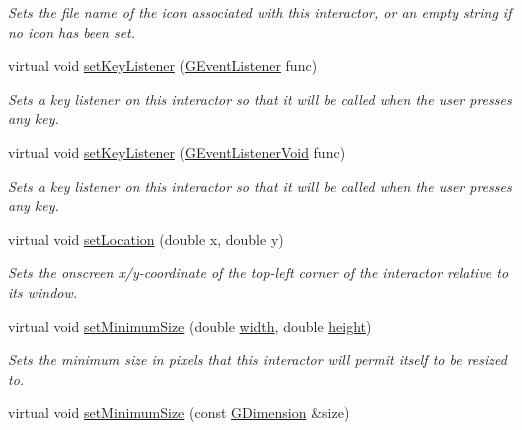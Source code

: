 \begin{DoxyCompactItemize}
\begin{DoxyCompactList}\small\item\em Sets the file name of the icon associated with this interactor, or an empty string if no icon has been set. \end{DoxyCompactList}\item 
virtual void \mbox{\hyperlink{classsgl_1_1GInteractor_aeb8324d3287fa1fbe093f4d6230cf0a6}{set\+Key\+Listener}} (\mbox{\hyperlink{namespacesgl_ae9f3e9eab70035da1a2b114e21357b25}{G\+Event\+Listener}} func)
\begin{DoxyCompactList}\small\item\em Sets a key listener on this interactor so that it will be called when the user presses any key. \end{DoxyCompactList}\item 
virtual void \mbox{\hyperlink{classsgl_1_1GInteractor_ae48ecea73606c7bd9423e1c7cc589cc9}{set\+Key\+Listener}} (\mbox{\hyperlink{namespacesgl_a54427ce97bb1c2804e4fe2b0a62e8b17}{G\+Event\+Listener\+Void}} func)
\begin{DoxyCompactList}\small\item\em Sets a key listener on this interactor so that it will be called when the user presses any key. \end{DoxyCompactList}\item 
virtual void \mbox{\hyperlink{classsgl_1_1GInteractor_a04594e8ba9b98513a64f1da00dcae18c}{set\+Location}} (double x, double y)
\begin{DoxyCompactList}\small\item\em Sets the onscreen x/y-\/coordinate of the top-\/left corner of the interactor relative to its window. \end{DoxyCompactList}\item 
virtual void \mbox{\hyperlink{classsgl_1_1GInteractor_a0cf428e207b7f22cc08138a90b1b87b2}{set\+Minimum\+Size}} (double \mbox{\hyperlink{classsgl_1_1GTable_ad72663daf610f2a0833a2fc3d78e4fdf}{width}}, double \mbox{\hyperlink{classsgl_1_1GTable_ad3774f6419003470f54fd495124ef51f}{height}})
\begin{DoxyCompactList}\small\item\em Sets the minimum size in pixels that this interactor will permit itself to be resized to. \end{DoxyCompactList}\item 
virtual void \mbox{\hyperlink{classsgl_1_1GInteractor_a3b1046117ac6cb7abe467e00ba8a81f4}{set\+Minimum\+Size}} (const \mbox{\hyperlink{structsgl_1_1GDimension}{G\+Dimension}} \&size)

\end{DoxyCompactItemize}
